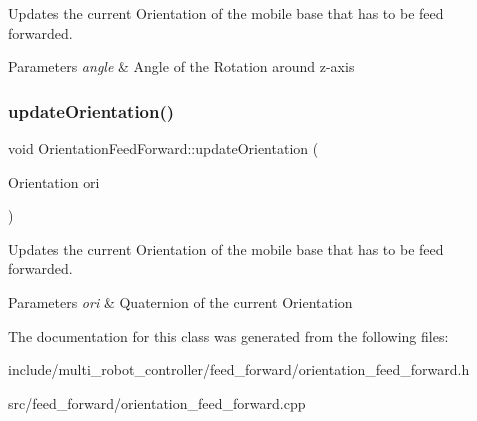 Updates the current Orientation of the mobile base that has to be feed forwarded. 


\begin{DoxyParams}{Parameters}
{\em angle} & Angle of the Rotation around z-\/axis \\
\hline
\end{DoxyParams}
\mbox{\label{classOrientationFeedForward_aed8f826976135c0cd55408a652993828}} 
\subsubsection{\texorpdfstring{update\+Orientation()}{updateOrientation()}\hspace{0.1cm}{\footnotesize\ttfamily [2/2]}}
{\footnotesize\ttfamily void Orientation\+Feed\+Forward\+::update\+Orientation (\begin{DoxyParamCaption}\item[{Orientation}]{ori }\end{DoxyParamCaption})}



Updates the current Orientation of the mobile base that has to be feed forwarded. 


\begin{DoxyParams}{Parameters}
{\em ori} & Quaternion of the current Orientation \\
\hline
\end{DoxyParams}


The documentation for this class was generated from the following files\+:\begin{DoxyCompactItemize}
\item 
include/multi\+\_\+robot\+\_\+controller/feed\+\_\+forward/orientation\+\_\+feed\+\_\+forward.\+h\item 
src/feed\+\_\+forward/orientation\+\_\+feed\+\_\+forward.\+cpp\end{DoxyCompactItemize}
